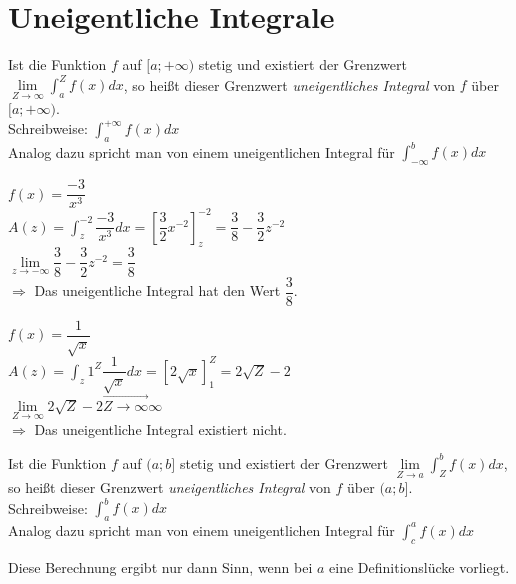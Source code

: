 \documentclass[main.tex]{subfiles}
\begin{document}
\section{Uneigentliche Integrale}
\begin{Definition}
  Ist die Funktion $f$ auf $[a;+\infty)$ stetig und existiert der Grenzwert \( \displaystyle\lim\limits_{Z \rightarrow \infty} \int_a^Z f(x)dx\),
  so heißt dieser Grenzwert \emph{uneigentliches Integral} von $f$ über $[a;+\infty)$.\\
  Schreibweise: \( \displaystyle\int_a^{+\infty} f(x)dx\)\\
  Analog dazu spricht man von einem uneigentlichen Integral für \( \displaystyle\int_{-\infty}^b f(x)dx\)
\end{Definition}
\begin{Beispiel}
  $f(x)=\dfrac{-3}{x^3}$\\
  \( \displaystyle A(z)=\int_z^{-2} \dfrac{-3}{x^3} dx = \left[\dfrac{3}{2}x^{-2}\right]_z^{-2} = \dfrac{3}{8}-\dfrac{3}{2}z^{-2}\)\\
  $\lim \limits_{z \rightarrow -\infty} \dfrac{3}{8}-\dfrac{3}{2}z^{-2} = \dfrac{3}{8}$\\
  $\Rightarrow$ Das uneigentliche Integral hat den Wert $\dfrac{3}{8}$.
\end{Beispiel}
\begin{Beispiel}
  $f(x)=\dfrac{1}{\sqrt x}$\\
  \( \displaystyle A(z)=\int_z1^{Z} \dfrac{1}{\sqrt x} dx = \left[2\sqrt x \right]_1^{Z} = 2\sqrt Z - 2\)\\
  $\lim \limits_{Z \rightarrow \infty} 2\sqrt Z - 2 \stackrel{\rightarrow}{Z \rightarrow \infty} \infty$\\
  $\Rightarrow$ Das uneigentliche Integral existiert nicht.
\end{Beispiel}
\begin{Definition}
  Ist die Funktion $f$ auf $(a;b]$ stetig und existiert der Grenzwert \( \displaystyle\lim\limits_{Z \rightarrow a} \int_Z^b f(x)dx\),
  so heißt dieser Grenzwert \emph{uneigentliches Integral} von $f$ über $(a;b]$.\\
  Schreibweise: \( \displaystyle\int_a^b f(x)dx\)\\
  Analog dazu spricht man von einem uneigentlichen Integral für \( \displaystyle\int_{c}^a f(x)dx\)
\end{Definition}
\begin{Bemerkung}
  Diese Berechnung ergibt nur dann Sinn, wenn bei $a$ eine Definitionslücke vorliegt.
\end{Bemerkung}
\end{document}
